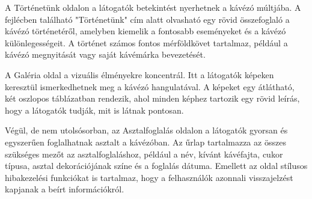 \documentclass{article}
\begin{document}
A Történetünk oldalon a látogatók betekintést nyerhetnek a kávézó múltjába. A fejlécben található "Történetünk" cím alatt olvasható egy rövid összefoglaló a kávézó történetéről, amelyben kiemelik a fontosabb eseményeket és a kávézó különlegességeit. A történet számos fontos mérföldkövet tartalmaz, például a kávézó megnyitását vagy saját kávémárka bevezetését.

A Galéria oldal a vizuális élményekre koncentrál. Itt a látogatók képeken keresztül ismerkedhetnek meg a kávézó hangulatával. A képeket egy átlátható, két oszlopos táblázatban rendezik, ahol minden képhez tartozik egy rövid leírás, hogy a látogatók tudják, mit is látnak pontosan.

Végül, de nem utolsósorban, az Asztalfoglalás oldalon a látogatók gyorsan és egyszerűen foglalhatnak asztalt a kávézóban. Az űrlap tartalmazza az összes szükséges mezőt az asztalfoglaláshoz, például a név, kívánt kávéfajta, cukor típusa, asztal dekorációjának színe és a foglalás dátuma. Emellett az oldal stílusos hibakezelési funkciókat is tartalmaz, hogy a felhasználók azonnali visszajelzést kapjanak a beírt információkról.
\end{document}

